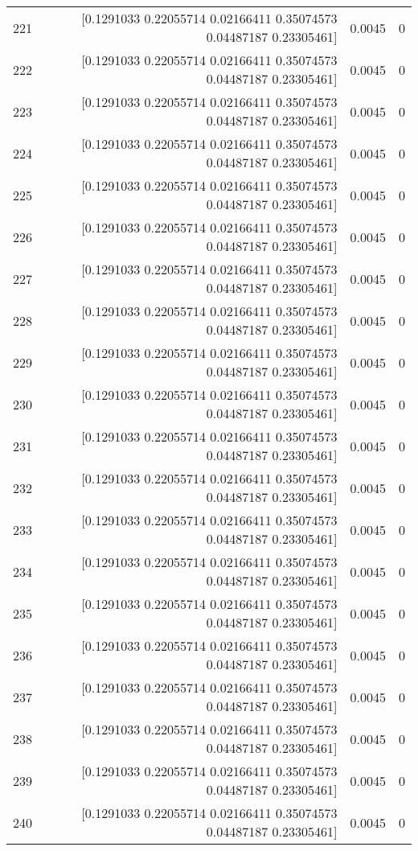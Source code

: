 \begin{longtable}{lrrr}
221 & [0.1291033  0.22055714 0.02166411 0.35074573 0.04487187 0.23305461] & 0.0045 & 0 \\
222 & [0.1291033  0.22055714 0.02166411 0.35074573 0.04487187 0.23305461] & 0.0045 & 0 \\
223 & [0.1291033  0.22055714 0.02166411 0.35074573 0.04487187 0.23305461] & 0.0045 & 0 \\
224 & [0.1291033  0.22055714 0.02166411 0.35074573 0.04487187 0.23305461] & 0.0045 & 0 \\
225 & [0.1291033  0.22055714 0.02166411 0.35074573 0.04487187 0.23305461] & 0.0045 & 0 \\
226 & [0.1291033  0.22055714 0.02166411 0.35074573 0.04487187 0.23305461] & 0.0045 & 0 \\
227 & [0.1291033  0.22055714 0.02166411 0.35074573 0.04487187 0.23305461] & 0.0045 & 0 \\
228 & [0.1291033  0.22055714 0.02166411 0.35074573 0.04487187 0.23305461] & 0.0045 & 0 \\
229 & [0.1291033  0.22055714 0.02166411 0.35074573 0.04487187 0.23305461] & 0.0045 & 0 \\
230 & [0.1291033  0.22055714 0.02166411 0.35074573 0.04487187 0.23305461] & 0.0045 & 0 \\
231 & [0.1291033  0.22055714 0.02166411 0.35074573 0.04487187 0.23305461] & 0.0045 & 0 \\
232 & [0.1291033  0.22055714 0.02166411 0.35074573 0.04487187 0.23305461] & 0.0045 & 0 \\
233 & [0.1291033  0.22055714 0.02166411 0.35074573 0.04487187 0.23305461] & 0.0045 & 0 \\
234 & [0.1291033  0.22055714 0.02166411 0.35074573 0.04487187 0.23305461] & 0.0045 & 0 \\
235 & [0.1291033  0.22055714 0.02166411 0.35074573 0.04487187 0.23305461] & 0.0045 & 0 \\
236 & [0.1291033  0.22055714 0.02166411 0.35074573 0.04487187 0.23305461] & 0.0045 & 0 \\
237 & [0.1291033  0.22055714 0.02166411 0.35074573 0.04487187 0.23305461] & 0.0045 & 0 \\
238 & [0.1291033  0.22055714 0.02166411 0.35074573 0.04487187 0.23305461] & 0.0045 & 0 \\
239 & [0.1291033  0.22055714 0.02166411 0.35074573 0.04487187 0.23305461] & 0.0045 & 0 \\
240 & [0.1291033  0.22055714 0.02166411 0.35074573 0.04487187 0.23305461] & 0.0045 & 0 \\

\end{longtable}
